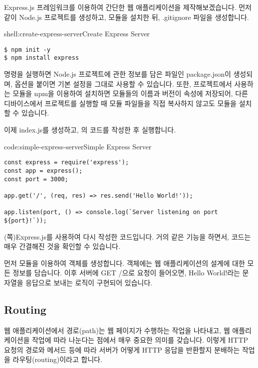 Express.js 프레임워크를 이용하여 간단한 웹 애플리케이션을 제작해보겠습니다. 먼저 \와 같이 Node.js 프로젝트를 생성하고,  모듈을 설치한 뒤, .gitignore 파일을 생성합니다.

\begin{shellenv}{shell:create-express-server}{Create Express Server}\begin{verbatim}
$ npm init -y
$ npm install express
\end{verbatim}
\end{shellenv}

 명령을 실행하면 Node.js 프로젝트에 관한 정보를 담은 파일인 package.json이 생성되며,  옵션을 붙이면 기본 설정을 그대로 사용할 수 있습니다. 또한, 프로젝트에서 사용하는 모듈을 npm을 이용하여 설치하면 모듈들의 이름과 버전이  속성에 저장되어, 다른 디바이스에서 프로젝트를 실행할 때 모듈 파일들을 직접 복사하지 않고도 모듈을 설치할 수 있습니다.

이제 index.js를 생성하고, 의 코드를 작성한 후 실행합니다.

\begin{codeenv}{code:simple-express-server}{Simple Express Server}\begin{verbatim}
const express = require('express');
const app = express();
const port = 3000;

app.get('/', (req, res) => res.send('Hello World!'));

app.listen(port, () => console.log(`Server listening on port ${port}!`));
\end{verbatim}
\end{codeenv}

\는 (\pageref{code:nodejs-simple-web-server}쪽)\를 Express.js를 사용하여 다시 작성한 코드입니다. \와 거의 같은 기능을 하면서, 코드는 매우 간결해진 것을 확인할 수 있습니다.

먼저  모듈을 이용하여  객체를 생성합니다.  객체에는 웹 애플리케이션의 설계에 대한 모든 정보를 담습니다. 이후 서버에 GET /으로 요청이 들어오면, Hello World!라는 문자열을 응답으로 보내는 로직이 구현되어 있습니다.

\subsection*{Routing}

웹 애플리케이션에서 경로(path)는 웹 페이지가 수행하는 작업을 나타내고, 웹 애플리케이션을 작업에 따라 나눈다는 점에서 매우 중요한 의미를 갖습니다. 이렇게 HTTP 요청의 경로와 메서드 등에 따라 서버가 어떻게 HTTP 응답을 반환할지 분배하는 작업을 라우팅(routing)이라고 합니다.

